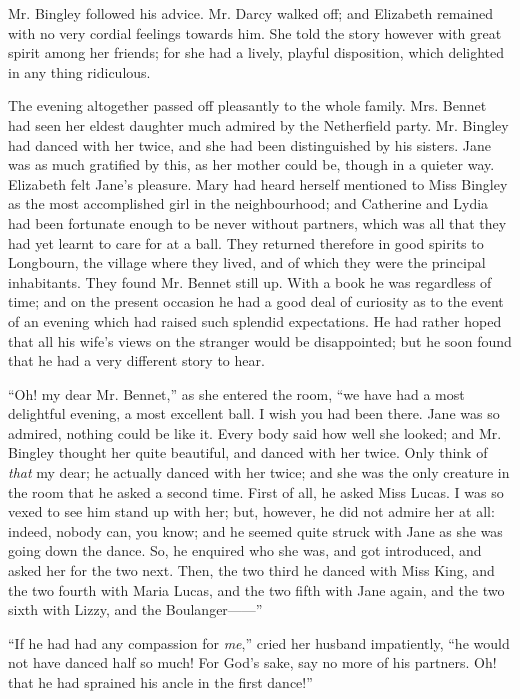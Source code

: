 Mr. Bingley followed his advice. Mr. Darcy walked off;
and Elizabeth remained with no very cordial feelings
towards him. She told the story however with great
spirit among her friends; for she had a lively, playful
disposition, which delighted in any thing ridiculous.

The evening altogether passed off pleasantly to the
whole family. Mrs. Bennet had seen her eldest daughter
much admired by the Netherfield party. Mr. Bingley had
danced with her twice, and she had been distinguished
by his sisters. Jane was as much gratified by this, as
her mother could be, though in a quieter way. Elizabeth
felt Jane’s pleasure. Mary had heard herself mentioned
to Miss Bingley as the most accomplished girl in the
neighbourhood; and Catherine and Lydia had been
fortunate enough to be never without partners, which
was all that they had yet learnt to care for at a ball.
They returned therefore in good spirits to Longbourn, the
village where they lived, and of which they were the
principal inhabitants. They found Mr. Bennet still up.
With a book he was regardless of time; and on the present
occasion he had a good deal of curiosity as to the event
of an evening which had raised such splendid expectations.
He had rather hoped that all his wife’s views on the
stranger would be disappointed; but he soon found that
he had a very different story to hear.

“Oh! my dear Mr. Bennet,” as she entered the room,
“we have had a most delightful evening, a most excellent
ball. I wish you had been there. Jane was so admired,
nothing could be like it. Every body said how well she
looked; and Mr. Bingley thought her quite beautiful,
and danced with her twice. Only think of \textit{that} my dear;
he actually danced with her twice; and she was the only
creature in the room that he asked a second time. First
of all, he asked Miss Lucas. I was so vexed to see him
stand up with her; but, however, he did not admire her
at all: indeed, nobody can, you know; and he seemed
quite struck with Jane as she was going down the dance.
So, he enquired who she was, and got introduced, and asked
her for the two next. Then, the two third he danced with
Miss King, and the two fourth with Maria Lucas, and the
two fifth with Jane again, and the two sixth with Lizzy,
and the Boulanger------”

“If he had had any compassion for \textit{me},” cried her
husband impatiently, “he would not have danced half
so much! For God’s sake, say no more of his partners.
Oh! that he had sprained his ancle in the first dance!”

